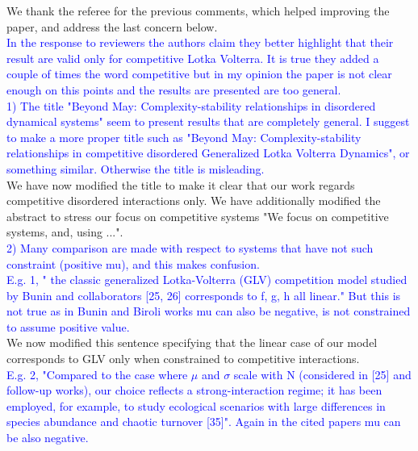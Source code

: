 \documentclass{article}
\newcommand{\blue}{\textcolor{blue}}
\begin{document}
We thank the referee for the previous comments, which helped improving the paper, and address the last concern below.
\\

\blue{In the response to reviewers the authors claim they better highlight  
	that their result are valid only for competitive Lotka Volterra. It is  
	true they added a couple of times the word competitive but in my  
	opinion the paper is not clear enough on this points and the results are presented are too general.} 
\\

\blue{1) The title "Beyond May: Complexity-stability relationships in  
	disordered dynamical systems" seem to present results that are 
	completely general. I suggest to make a more proper title such as  
	"Beyond May: Complexity-stability relationships in competitive  
	disordered Generalized Lotka Volterra Dynamics", or something similar.  
	Otherwise the title is misleading.} 
\\	

We have now modified the title to make it clear that our work regards competitive disordered interactions only. We have additionally modified the abstract to stress our focus on competitive systems "We focus on competitive systems, and, using ...".
\\

\blue{2) Many comparison are made with respect to systems that have not such  
	constraint (positive mu), and this makes confusion.} 
\\	
	
\blue{E.g. 1, " the classic generalized Lotka-Volterra (GLV) competition  
	model studied by Bunin and collaborators [25, 26] corresponds to f, g,  
	h all linear." But this is not true as in Bunin and Biroli works mu  
	can also be negative, is not constrained to assume positive value.}   
\\
	
We now modified this sentence specifying that the linear case of our model corresponds to GLV only when constrained to competitive interactions. 
\\	

\blue{E.g. 2, "Compared to the case where $\mu$ and $\sigma$ scale with N (considered  
	in [25] and follow-up works), our choice reflects a strong-interaction  
	regime; it has been employed, for example, to study ecological  
	scenarios with large differences in species abundance and chaotic  
	turnover [35]". Again in the cited papers mu can be also negative.}  
\\
\end{document}
